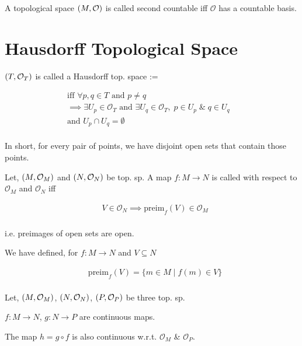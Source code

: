 \begin{definition}
    A topological space $ \left(  M, \mathcal{O} \right)$ is called second countable iff $ \mathcal{O}$ has a countable basis.
\end{definition}

\section{Hausdorff Topological Space}

\begin{definition}
    $ \left(  T, \mathcal{O}_T \right)$ is called a Hausdorff top. space :=

    \begin{align*}
        \text{iff } \forall p, q \in T \text{ and } p \neq q & \\
        \implies \exists U_p \in \mathcal{O}_T \text{ and } \exists U_q \in \mathcal{O}_T, \; p \in U_p \; \& \; q \in U_q & \\
        \text{and } U_p \cap U_q = \emptyset & \\
    \end{align*}
\end{definition}

In short, for every pair of points, we have disjoint open sets that contain those points.

\begin{definition}
    Let, $ \left(  M, \mathcal{O}_M \right)$ and $ \left(  N, \mathcal{O}_N \right)$ be top. sp. A map $ f: M \longrightarrow N$ is called  with respect to $ \mathcal{O}_M$ and $ \mathcal{O}_N$ iff

    \begin{align*}
        & V \in \mathcal{O}_N \implies \text{preim}_f(V) \in \mathcal{O}_M \\
    \end{align*}

    i.e. preimages of open sets are open.
\end{definition}

We have defined, for $ f: M \longrightarrow N$ and $ V \subseteq N$

\begin{align*}
    & \text{preim}_f(V) = \{ m \in M \mid f(m) \in V \} \\
\end{align*}

\begin{proposition}
    Let, $ \left(  M, \mathcal{O}_M \right)$, $ \left(  N, \mathcal{O}_N \right)$, $ \left(  P, \mathcal{O}_P \right)$ be three top. sp.

    $ f: M \longrightarrow N$, $ g: N \longrightarrow P$ are continuous maps.

    The map $ h = g \circ f$ is also continuous w.r.t. $ \mathcal{O}_M$ \& $ \mathcal{O}_P$.
\end{proposition}

